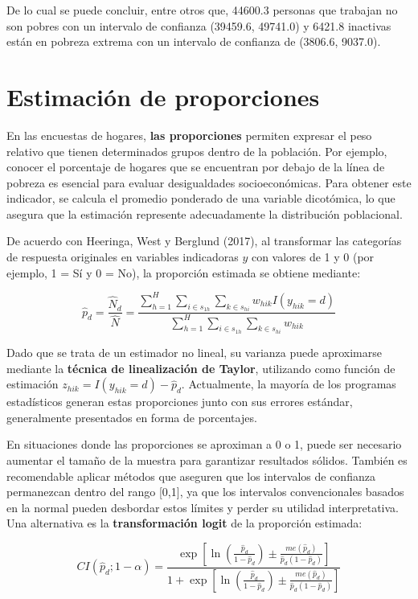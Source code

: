 \documentclass[
  12pt,
]{book}
\begin{document}
De lo cual se puede concluir, entre otros que, 44600.3 personas que trabajan no son pobres con un intervalo de confianza (39459.6, 49741.0) y 6421.8 inactivas están en pobreza extrema con un intervalo de confianza de (3806.6, 9037.0).

\section{Estimación de proporciones}\label{estimaciuxf3n-de-proporciones}

En las encuestas de hogares, \textbf{las proporciones} permiten expresar el peso relativo que tienen determinados grupos dentro de la población. Por ejemplo, conocer el porcentaje de hogares que se encuentran por debajo de la línea de pobreza es esencial para evaluar desigualdades socioeconómicas. Para obtener este indicador, se calcula el promedio ponderado de una variable dicotómica, lo que asegura que la estimación represente adecuadamente la distribución poblacional.

De acuerdo con Heeringa, West y Berglund (2017), al transformar las categorías de respuesta originales en variables indicadoras \(y\) con valores de 1 y 0 (por ejemplo, 1 = Sí y 0 = No), la proporción estimada se obtiene mediante:

\[\hat{p}_d = \frac{\hat{N}_d}{\hat{N}} = \frac{\displaystyle\sum_{h=1}^{H} \sum_{i \in s_{1h}} \sum_{k \in s_{hi}} w_{hik} I(y_{hik}=d)} {\displaystyle\sum_{h=1}^{H} \sum_{i \in s_{1h}} \sum_{k \in s_{hi}} w_{hik}}\]

Dado que se trata de un estimador no lineal, su varianza puede aproximarse mediante la \textbf{técnica de linealización de Taylor}, utilizando como función de estimación \(z_{hik}=I(y_{hik}=d)-\hat{p}_d\). Actualmente, la mayoría de los programas estadísticos generan estas proporciones junto con sus errores estándar, generalmente presentados en forma de porcentajes.

En situaciones donde las proporciones se aproximan a 0 o 1, puede ser necesario aumentar el tamaño de la muestra para garantizar resultados sólidos. También es recomendable aplicar métodos que aseguren que los intervalos de confianza permanezcan dentro del rango {[}0,1{]}, ya que los intervalos convencionales basados en la normal pueden desbordar estos límites y perder su utilidad interpretativa. Una alternativa es la \textbf{transformación logit} de la proporción estimada:

\[CI(\hat{p}_d; 1-\alpha) = \frac{\exp \left[\ln\left(\frac{\hat{p}_d}{1-\hat{p}_d}\right) \pm \frac{me(\hat{p}_d)}{\hat{p}_d(1-\hat{p}_d)}\right]}{1 + \exp \left[\ln\left(\frac{\hat{p}_d}{1-\hat{p}_d}\right) \pm \frac{me(\hat{p}_d)}{\hat{p}_d(1-\hat{p}_d)}\right]}\]
\end{document}
